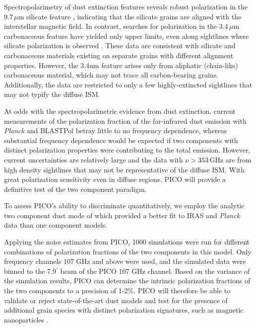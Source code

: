 \documentclass[PICOReport.tex]{subfiles}
\begin{document}
Spectropolarimetry of dust extinction features reveals robust polarization in the 9.7\,$\mu$m silicate feature \citep[e.g.,][]{Smith2000}, indicating that the silicate grains are aligned with the interstellar magnetic field. In contrast, searches for polarization in the 3.4\,$\mu$m carbonaceous feature have yielded only upper limits, even along sightlines where silicate polarization is observed \citep{Chiar2006,Mason2007}. These data are consistent with silicate and carbonaceous materials existing on separate grains with different alignment properties. However, the 3.4um feature arises only from aliphatic (chain-like) carbonaceous material, which may not trace all carbon-bearing grains. Additionally, the data are restricted to only a few highly-extincted sightlines that may not typify the diffuse ISM.

At odds with the spectropolarimetric evidence from dust extinction, current measurements of the polarization fraction of the far-infrared dust emission with {\it Planck} \citep{Planck_Int_XXII} and BLASTPol \citep{Ashton2018} betray little to no frequency dependence, whereas substantial frequency dependence would be expected if two components with distinct polarization properties were contributing to the total emission. However, current uncertainties are relatively large and the data with $\nu > 353\,$GHz are from high density sightlines that may not be representative of the diffuse ISM. With great polarization sensitivity even in diffuse regions, PICO will provide a definitive test of the two component paradigm.

To assess PICO's ability to discriminate quantitatively, we employ the analytic two component dust mode of \cite{Meisner2015} which provided a better fit to IRAS and {\it Planck} data than one component models. 

Applying the noise estimates from PICO, 1000 simulations were run for different combinations of polarization fractions of the two components in this model. Only frequency channels 107 GHz and above were used, and the simulated data were binned to the 7.9$^\prime$ beam of the PICO 107 GHz channel. Based on the variance of the simulation results, PICO can determine the intrinsic polarization fractions of the two components to a precision of 1-2\%. PICO will therefore be able to validate or reject state-of-the-art dust models \citep[e.g.][Hensley \& Draine, in prep]{Guillet2018} and test for the presence of additional grain species with distinct polarization signatures, such as magnetic nanoparticles \citep{Draine2013}.%
%
\end{document}

